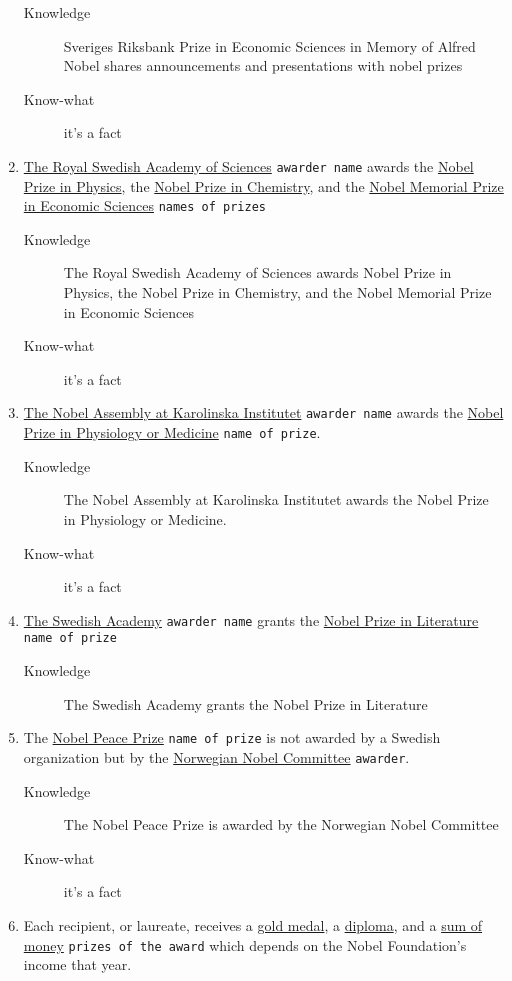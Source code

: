 \documentclass[a4paper,10pt,twoside,twocolumn]{article}
\begin{document}
\begin{enumerate}
\begin{description}
\item[{Knowledge}] Sveriges Riksbank Prize in Economic Sciences in Memory of Alfred Nobel shares announcements and presentations with nobel prizes
\item[{Know-what}] it's a fact
\end{description}
\item \uline{The Royal Swedish Academy of Sciences} \texttt{awarder name} awards the \uline{Nobel Prize in Physics}, the \uline{Nobel Prize in Chemistry}, and the \uline{Nobel Memorial Prize in Economic Sciences} \texttt{names of prizes}
\begin{description}
\item[{Knowledge}] The Royal Swedish Academy of Sciences awards Nobel Prize in Physics, the Nobel Prize in Chemistry, and the Nobel Memorial Prize in Economic Sciences
\item[{Know-what}] it's a fact
\end{description}
\item \uline{The Nobel Assembly at Karolinska Institutet} \texttt{awarder name} awards the \uline{Nobel Prize in Physiology or Medicine} \texttt{name of prize}.
\begin{description}
\item[{Knowledge}] The Nobel Assembly at Karolinska Institutet awards the Nobel Prize in Physiology or Medicine.
\item[{Know-what}] it's a fact
\end{description}
\item \uline{The Swedish Academy} \texttt{awarder name} grants the \uline{Nobel Prize in Literature} \texttt{name of prize}
\begin{description}
\item[{Knowledge}] The Swedish Academy grants the Nobel Prize in Literature
\end{description}
\item The \uline{Nobel Peace Prize} \texttt{name of prize} is not awarded by a Swedish organization but by the \uline{Norwegian Nobel Committee} \texttt{awarder}.
\begin{description}
\item[{Knowledge}] The Nobel Peace Prize is awarded by the Norwegian Nobel Committee
\item[{Know-what}] it's a fact
\end{description}
\item Each recipient, or laureate, receives a \uline{gold medal}, a \uline{diploma}, and a \uline{sum of money} \texttt{prizes of the award} which depends on the Nobel Foundation's income that year.

\end{enumerate}
\end{document}
